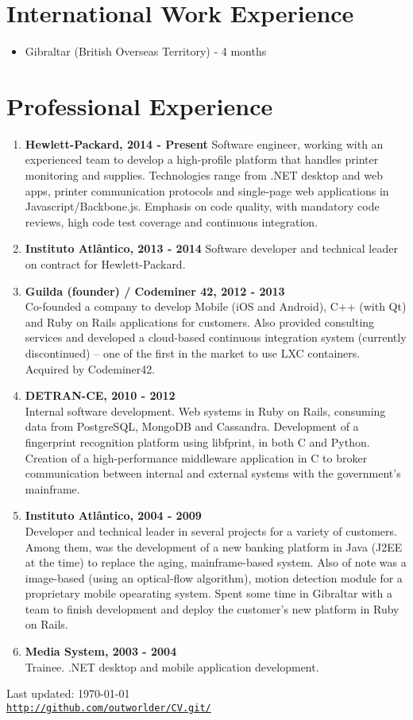 \documentclass[letterpaper]{article}
\def\footerlink{http://github.com/outworlder/CV.git/}
\begin{document}
\section*{International Work Experience}
\begin{itemize}
  \item Gibraltar (British Overseas Territory) - 4 months
\end{itemize}

\section*{Professional Experience}

\begin{enumerate}
  \item
  \textbf{Hewlett-Packard, 2014 - Present}
  Software engineer, working with an experienced team to develop a high-profile platform that handles printer monitoring and supplies. Technologies range from .NET desktop and web apps, printer communication protocols and single-page web applications in Javascript/Backbone.js. Emphasis on code quality, with mandatory code reviews, high code test coverage and continuous integration.
  \item
  \textbf{Instituto Atlântico, 2013 - 2014}
  Software developer and technical leader on contract for Hewlett-Packard.
  \item
  \textbf{Guilda (founder) / Codeminer 42, 2012 - 2013 } \\
  Co-founded a company to develop Mobile (iOS and Android), C++ (with Qt) and Ruby on Rails applications for customers. Also provided consulting services and developed a cloud-based continuous integration system (currently discontinued) – one of the first in the market to use LXC containers. Acquired by Codeminer42.
  \item
  \textbf{DETRAN-CE, 2010 - 2012} \\
  Internal software development. Web systems in Ruby on Rails, consuming data from PostgreSQL, MongoDB and Cassandra. Development of a fingerprint recognition platform using libfprint, in both C and Python. Creation of a high-performance middleware application in C to broker communication between internal and external systems with the government's mainframe.
  \item
  \textbf{Instituto Atlântico, 2004 - 2009 } \\
  Developer and technical leader in several projects for a variety of customers. Among them, was the development of a new banking platform in Java (J2EE at the time) to replace the aging, mainframe-based system. Also of note was a image-based (using an optical-flow algorithm), motion detection module for a proprietary mobile opearating system. Spent some time in Gibraltar with a team to finish development and deploy the customer's new platform in Ruby on Rails.
  \item
  \textbf{Media System, 2003 - 2004} \\
  Trainee. .NET desktop and mobile application development.
\end{enumerate}

\bigskip

\begin{center}
  \begin{footnotesize}
    Last updated: \today \\
    \href{\footerlink}{\texttt{\footerlink}}
  \end{footnotesize}
\end{center}
\end{document}
